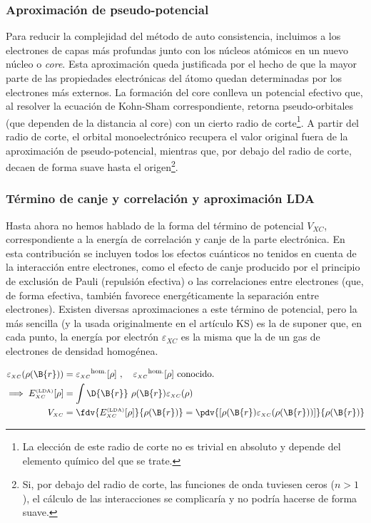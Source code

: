 \subsubsection{Aproximación de pseudo-potencial}
Para reducir la complejidad del método de auto consistencia, incluimos a los electrones de capas más profundas junto con los núcleos atómicos en un nuevo núcleo o \emph{core}. Esta aproximación queda justificada por el hecho de que la mayor parte de las propiedades electrónicas del átomo quedan determinadas por los electrones más externos. La formación del core conlleva un potencial efectivo que, al resolver la ecuación de Kohn-Sham correspondiente, retorna pseudo-orbitales (que dependen de la distancia al core) con un cierto radio de corte\footnote{La elección de este radio de corte no es trivial en absoluto y depende del elemento químico del que se trate.}. A partir del radio de corte, el orbital monoelectrónico recupera el valor original fuera de la aproximación de pseudo-potencial, mientras que, por debajo del radio de corte, decaen de forma suave hasta el origen\footnote{Si, por debajo del radio de corte, las funciones de onda tuviesen ceros ($n>1$), el cálculo de las interacciones se complicaría y no podría hacerse de forma suave.}.

\subsubsection[Aproximación LDA]{Término de canje y correlación y aproximación LDA}
Hasta ahora no hemos hablado de la forma del término de potencial $V_{\scriptscriptstyle XC}$, correspondiente a la energía de correlación y canje de la parte electrónica. En esta contribución se incluyen todos los efectos cuánticos no tenidos en cuenta de la interacción entre electrones, como el efecto de canje producido por el principio de exclusión de Pauli (repulsión efectiva) o las correlaciones entre electrones (que, de forma efectiva, también favorece energéticamente la separación entre electrones). Existen diversas aproximaciones a este término de potencial, pero la más sencilla (y la usada originalmente en el artículo KS) es la de suponer que, en cada punto, la energía por electrón $\varepsilon_{\scriptscriptstyle XC}$ es la misma que la de un gas de electrones de densidad homogénea.

\begin{align}
    \varepsilon_{\scriptscriptstyle XC}(\rho(\B{r})) &= \varepsilon_{\scriptscriptstyle XC}{}^{\text{hom.}}[\rho]\ , \quad \varepsilon_{\scriptscriptstyle XC}{}^{\text{hom.}}[\rho]  \text{ conocido.} \\
    \implies E_{\scriptscriptstyle XC}^\text{\tiny (LDA)}[\rho] &= \int \D{\B{r}} \ \rho(\B{r}) \varepsilon_{\scriptscriptstyle XC}(\rho)\\
    V_{\scriptscriptstyle XC} &= \fdv{E_{\scriptscriptstyle XC}^\text{\tiny (LDA)}[\rho]}{\rho(\B{r})} = \pdv{[\rho(\B{r}) \varepsilon_{\scriptscriptstyle XC}(\rho(\B{r}))]}{\rho(\B{r})}
\end{align}

